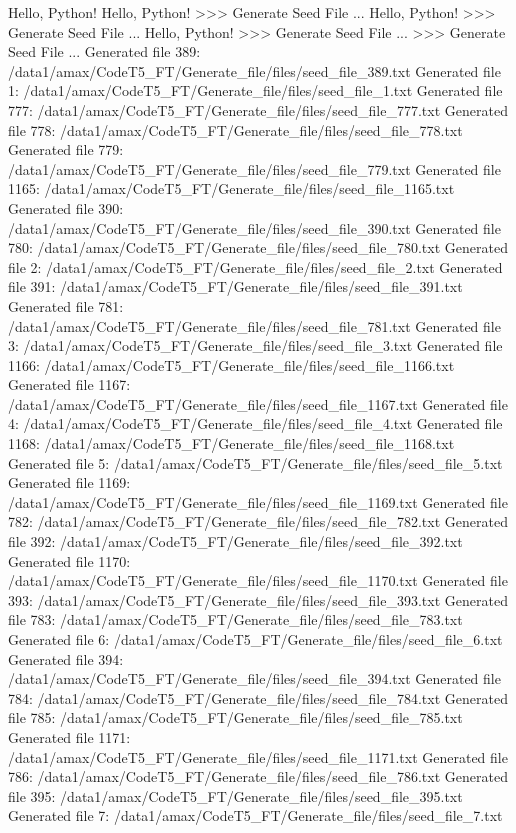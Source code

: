 Hello, Python!
Hello, Python!
>>> Generate Seed File ...
Hello, Python!
>>> Generate Seed File ...
Hello, Python!
>>> Generate Seed File ...
>>> Generate Seed File ...
Generated file 389: /data1/amax/CodeT5_FT/Generate_file/files/seed_file_389.txt
Generated file 1: /data1/amax/CodeT5_FT/Generate_file/files/seed_file_1.txt
Generated file 777: /data1/amax/CodeT5_FT/Generate_file/files/seed_file_777.txt
Generated file 778: /data1/amax/CodeT5_FT/Generate_file/files/seed_file_778.txt
Generated file 779: /data1/amax/CodeT5_FT/Generate_file/files/seed_file_779.txt
Generated file 1165: /data1/amax/CodeT5_FT/Generate_file/files/seed_file_1165.txt
Generated file 390: /data1/amax/CodeT5_FT/Generate_file/files/seed_file_390.txt
Generated file 780: /data1/amax/CodeT5_FT/Generate_file/files/seed_file_780.txt
Generated file 2: /data1/amax/CodeT5_FT/Generate_file/files/seed_file_2.txt
Generated file 391: /data1/amax/CodeT5_FT/Generate_file/files/seed_file_391.txt
Generated file 781: /data1/amax/CodeT5_FT/Generate_file/files/seed_file_781.txt
Generated file 3: /data1/amax/CodeT5_FT/Generate_file/files/seed_file_3.txt
Generated file 1166: /data1/amax/CodeT5_FT/Generate_file/files/seed_file_1166.txt
Generated file 1167: /data1/amax/CodeT5_FT/Generate_file/files/seed_file_1167.txt
Generated file 4: /data1/amax/CodeT5_FT/Generate_file/files/seed_file_4.txt
Generated file 1168: /data1/amax/CodeT5_FT/Generate_file/files/seed_file_1168.txt
Generated file 5: /data1/amax/CodeT5_FT/Generate_file/files/seed_file_5.txt
Generated file 1169: /data1/amax/CodeT5_FT/Generate_file/files/seed_file_1169.txt
Generated file 782: /data1/amax/CodeT5_FT/Generate_file/files/seed_file_782.txt
Generated file 392: /data1/amax/CodeT5_FT/Generate_file/files/seed_file_392.txt
Generated file 1170: /data1/amax/CodeT5_FT/Generate_file/files/seed_file_1170.txt
Generated file 393: /data1/amax/CodeT5_FT/Generate_file/files/seed_file_393.txt
Generated file 783: /data1/amax/CodeT5_FT/Generate_file/files/seed_file_783.txt
Generated file 6: /data1/amax/CodeT5_FT/Generate_file/files/seed_file_6.txt
Generated file 394: /data1/amax/CodeT5_FT/Generate_file/files/seed_file_394.txt
Generated file 784: /data1/amax/CodeT5_FT/Generate_file/files/seed_file_784.txt
Generated file 785: /data1/amax/CodeT5_FT/Generate_file/files/seed_file_785.txt
Generated file 1171: /data1/amax/CodeT5_FT/Generate_file/files/seed_file_1171.txt
Generated file 786: /data1/amax/CodeT5_FT/Generate_file/files/seed_file_786.txt
Generated file 395: /data1/amax/CodeT5_FT/Generate_file/files/seed_file_395.txt
Generated file 7: /data1/amax/CodeT5_FT/Generate_file/files/seed_file_7.txt
